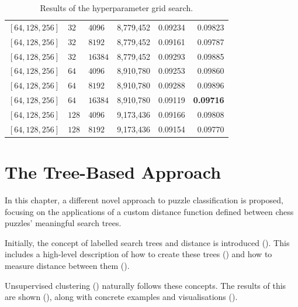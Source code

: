 \begin{table}[H]
\begin{adjustbox}{width=\textwidth}
\begin{tabular}{lll|rrr}
      $[64, 128, 256 ]$& $32$ & $4096$ & 8,779,452 & 0.09234 & 0.09823 \\
      $[64, 128, 256 ]$& $32$ & $8192$ & 8,779,452 & 0.09161 & 0.09787 \\
      $[64, 128, 256 ]$& $32$ & $16384$ & 8,779,452 & 0.09293 & 0.09885 \\[0.1cm]

      $[64, 128, 256 ]$& $64$ & $4096$ & 8,910,780 & 0.09253 & 0.09860 \\
      $[64, 128, 256 ]$& $64$ & $8192$ & 8,910,780 & 0.09288 & 0.09896 \\
      $[64, 128, 256 ]$& $64$ & $16384$ & 8,910,780 & 0.09119 & \textbf{0.09716} \\[0.1cm]

      $[64, 128, 256 ]$& $128$  & $4096$ & 9,173,436 & 0.09166 & 0.09808 \\
      $[64, 128, 256 ]$& $128$ & $8192$ & 9,173,436 & 0.09154 & 0.09770 \\

    \end{tabular}
  \end{adjustbox}
  \caption{Results of the hyperparameter grid search.}
  \label{tabHyperparam}
\end{table}














\chapter{The Tree-Based Approach}\label{treeChapter}

In this chapter, a different novel approach to puzzle classification is
proposed, focusing on the applications of a custom distance function defined
between chess puzzles' meaningful search trees.

Initially, the concept of labelled search trees and distance is introduced
(). This includes a high-level description of how to create these
trees () and how to measure distance between them
().

Unsupervised clustering () naturally follows these concepts. The
results of this are shown (), along with concrete examples and
visualisations ().

